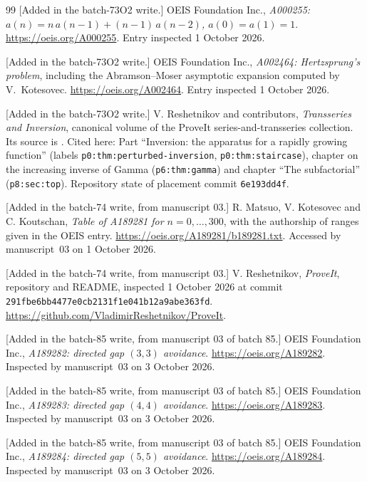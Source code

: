 \documentclass[11pt]{article}
\numberwithin{equation}{section}
\theoremstyle{definition}
\theoremstyle{remark}
\theoremstyle{definition}
\begin{document}
\begin{thebibliography}{99}
[Added in the batch-73O2 write.] OEIS Foundation Inc., \emph{A000255:
$a(n)=n\,a(n-1)+(n-1)\,a(n-2)$, $a(0)=a(1)=1$}.
\url{https://oeis.org/A000255}. Entry inspected 1 October 2026.

[Added in the batch-73O2 write.] OEIS Foundation Inc., \emph{A002464:
Hertzsprung's problem}, including the Abramson--Moser asymptotic expansion
computed by V.~Kotesovec. \url{https://oeis.org/A002464}. Entry inspected
1 October 2026.

\begingroup\raggedright
[Added in the batch-73O2 write.] V. Reshetnikov and contributors,
\emph{Transseries and Inversion}, canonical volume of the ProveIt
series-and-transseries collection. Its source is
\allowbreak
{}. Cited here:
Part ``Inversion: the apparatus for a rapidly growing function''
(labels \texttt{p0:thm:perturbed-inversion}, \texttt{p0:thm:staircase}),
chapter on the increasing inverse of Gamma (\texttt{p6:thm:gamma}) and chapter
``The subfactorial'' (\texttt{p8:sec:top}). Repository state of placement
commit \texttt{6e193dd4f}.\par\endgroup

[Added in the batch-74 write, from manuscript 03.] R. Matsuo, V. Kotesovec
and C. Koutschan, \emph{Table of A189281 for $n=0,\ldots,300$}, with the
authorship of ranges given in the OEIS entry.
\url{https://oeis.org/A189281/b189281.txt}. Accessed by manuscript~03 on
1 October 2026.

\begingroup\raggedright
[Added in the batch-74 write, from manuscript 03.] V. Reshetnikov,
\emph{ProveIt}, repository and README, inspected 1 October 2026 at commit
\nolinkurl{291fbe6bb4477e0cb2131f1e041b12a9abe363fd}.
\url{https://github.com/VladimirReshetnikov/ProveIt}.\par\endgroup

[Added in the batch-85 write, from manuscript 03 of batch 85.] OEIS
Foundation Inc., \emph{A189282: directed gap $(3,3)$ avoidance}.
\url{https://oeis.org/A189282}. Inspected by manuscript~03 on 3 October 2026.

[Added in the batch-85 write, from manuscript 03 of batch 85.] OEIS
Foundation Inc., \emph{A189283: directed gap $(4,4)$ avoidance}.
\url{https://oeis.org/A189283}. Inspected by manuscript~03 on 3 October 2026.

[Added in the batch-85 write, from manuscript 03 of batch 85.] OEIS
Foundation Inc., \emph{A189284: directed gap $(5,5)$ avoidance}.
\url{https://oeis.org/A189284}. Inspected by manuscript~03 on 3 October 2026.


\end{thebibliography}
\end{document}
